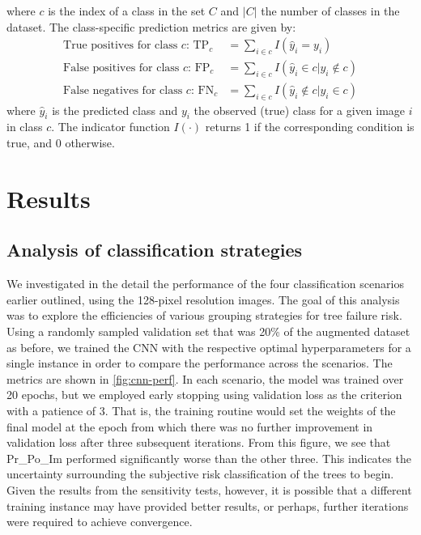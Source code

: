 \documentclass[Journal,letterpaper, SingleSpace, InsideFigs]{ascelike-new}
\begin{document}
where $c$ is the index of a class in the set $C$ and $|C|$ the number of classes in the dataset. 
The class-specific prediction metrics are given by:
\begin{align}
    \text{True positives for class $c$: } \mathrm{TP}_c &= \sum_{i \in c} I(\hat{y}_i = y_i ) \\
    \text{False positives for class $c$: } \mathrm{FP}_c &= \sum_{i \in c} I(\hat{y}_i \in c | y_i \notin c) \\
    \text{False negatives for class $c$: } \mathrm{FN}_c &= \sum_{i \in c} I(\hat{y}_i \notin c | y_i \in c)
\end{align}
where $\hat y_i$ is the predicted class and $y_i$ the observed (true) class for a given image $i$ in class $c$. The indicator function $I(\cdot)$ returns 1 if the corresponding condition is true, and 0 otherwise.

\section{Results}



\subsection{Analysis of classification strategies}
We investigated in the detail the performance of the four classification scenarios earlier outlined, using the 128-pixel resolution images.
The goal of this analysis was to explore the efficiencies of various grouping strategies for tree failure risk.
Using a randomly sampled validation set that was 20\% of the augmented dataset as before, we trained the CNN with the respective optimal hyperparameters for a single instance in order to compare the performance across the scenarios. The metrics are shown in \autoref{fig:cnn-perf}.
In each scenario, the model was trained over 20 epochs, but we employed early stopping using validation loss as the criterion with a patience of 3. That is, the training routine would set the weights of the final model at the epoch from which there was no further improvement in validation loss after three subsequent iterations. From this figure, we see that Pr\_Po\_Im performed significantly worse than the other three. This indicates the uncertainty surrounding the subjective risk classification of the trees to begin. Given the results from the sensitivity tests, however, it is possible that a different training instance may have provided better results, or perhaps, further iterations were required to achieve convergence.
\end{document}
